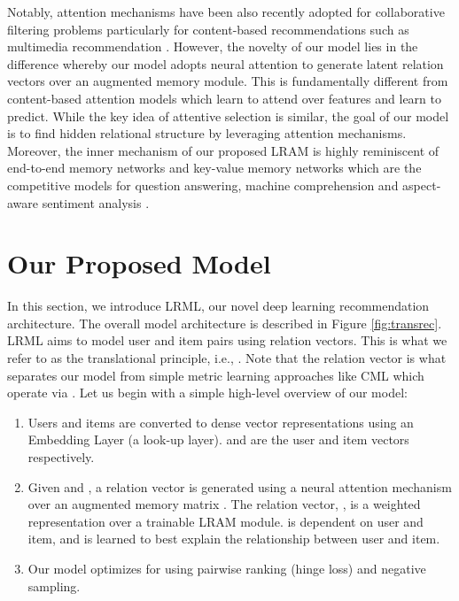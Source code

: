 \documentclass[sigconf]{acmart}
\begin{document}
 Notably, attention mechanisms have been also recently adopted for collaborative filtering problems particularly for content-based recommendations such as multimedia recommendation \cite{DBLP:conf/sigir/ChenZ0NLC17}. However, the novelty of our model lies in the difference whereby our model adopts neural attention to generate latent relation vectors over an augmented memory module. This is fundamentally different from content-based attention models which learn to attend over features and learn to predict. While the key idea of attentive selection is similar, the goal of our model is to find hidden relational structure by leveraging attention mechanisms. Moreover, the inner mechanism of our proposed LRAM is highly reminiscent of end-to-end memory networks \cite{DBLP:conf/nips/SukhbaatarSWF15} and key-value memory networks \cite{miller2016key} which are the competitive models for question answering, machine comprehension and aspect-aware sentiment analysis \cite{DBLP:conf/cikm/TayTH17}.

\section{Our Proposed Model}


In this section, we introduce \textsc{LRML}, our novel deep learning recommendation architecture. The overall model architecture is described in Figure \ref{fig:transrec}. \textsc{LRML} aims to model user and item pairs using relation vectors. This is what we refer to as the translational principle, i.e., . Note that the relation vector  is what separates our model from simple metric learning approaches like CML which operate via . Let us begin with a simple high-level overview of our model:
\begin{enumerate}
\item Users and items are converted to dense vector representations using an Embedding Layer (a look-up layer).  and  are the user and item vectors respectively. 
\item Given  and , a relation vector  is generated using a neural attention mechanism over an augmented memory matrix . The relation vector, , is a weighted representation over a trainable LRAM module.  is dependent on user and item, and is learned to best explain the relationship between user and item. 
\item Our model optimizes for  using pairwise ranking (hinge loss) and negative sampling. 
\end{enumerate}
\end{document}
